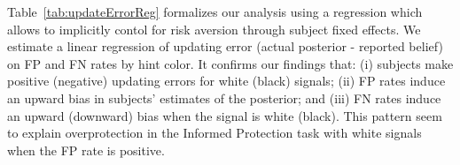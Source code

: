 \documentclass[12pt,a4paper]{article}
\begin{document}
Table~\ref{tab:updateErrorReg} formalizes our analysis using a regression which allows to implicitly contol for risk aversion through subject fixed effects. We estimate a linear regression of updating error (actual posterior - reported belief) on FP and FN rates by hint color. It confirms our findings that: (i) subjects make positive (negative) updating errors for white (black) signals; (ii) FP rates induce an upward bias in subjects' estimates of the posterior; and (iii) FN rates induce an upward (downward) bias when the signal is white (black). This pattern seem to explain overprotection in the Informed Protection task with white signals when the FP rate is positive.



\begin{table}[H]\centering 
\caption{Average Updating Error by Signal Type} 
\label{tab:nonparError}
\end{table}
\end{document}

